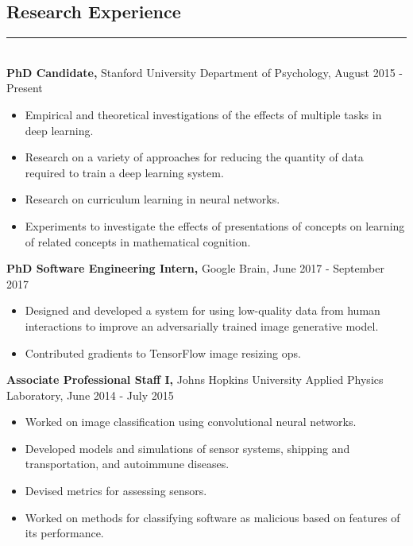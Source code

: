 \documentclass[margin]{res}
\begin{document}
\begin{resume}
\vspace{1pt}\section{Research Experience} \vspace{-15pt} \rule{\textwidth}{0.5pt} \\[3pt]
{\bf PhD Candidate,} Stanford University Department of Psychology, August 2015 - Present 
\begin{itemize} \itemsep -2pt
  \item Empirical and theoretical investigations of the effects of multiple tasks in deep learning. 
  \item Research on a variety of approaches for reducing the quantity of data required to train a deep learning system.
  \item Research on curriculum learning in neural networks.
  \item Experiments to investigate the effects of presentations of concepts on learning of related concepts in mathematical cognition.
\end{itemize}\vspace{-8pt}
{\bf PhD Software Engineering Intern,} Google Brain, June 2017 - September 2017 
\begin{itemize} \itemsep -2pt
  \item Designed and developed a system for using low-quality data from human interactions to improve an adversarially trained image generative model. 
  \item Contributed gradients to TensorFlow image resizing ops.
\end{itemize}\vspace{-8pt}
{\bf Associate Professional Staff I,} Johns Hopkins University Applied Physics Laboratory, June 2014 - July 2015 
\begin{itemize} \itemsep -2pt
 \item Worked on image classification using convolutional neural networks.  \item Developed models and simulations of sensor systems, shipping and transportation, and autoimmune diseases. \item Devised metrics for assessing sensors. \item Worked on methods for classifying software as malicious based on features of its performance. \end{itemize}\vspace{-8pt}

\end{resume}
\end{document}
